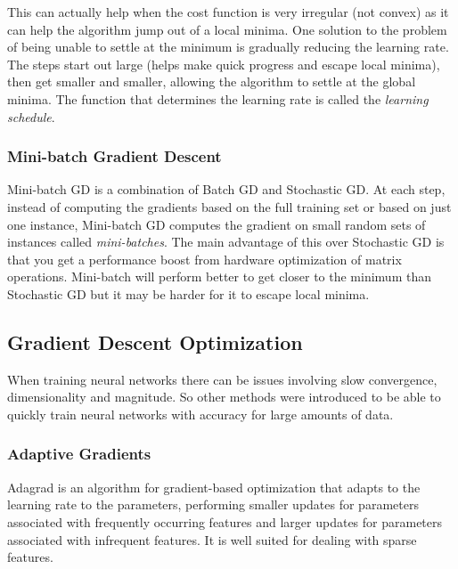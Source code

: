 \documentclass[12pt]{article}
\begin{document}
            This can actually help when the cost function is very irregular (not convex) as it can help the algorithm
            jump out of a local minima. One solution to the problem of being unable to settle at the minimum is
            gradually reducing the learning rate. The steps start out large (helps make quick progress and escape local
            minima), then get smaller and smaller, allowing the algorithm to settle at the global minima. The function
            that determines the learning rate is called the \textit{learning schedule}.
        
        \subsubsection{Mini-batch Gradient Descent}
            Mini-batch GD is a combination of Batch GD and Stochastic GD. At each step, instead of computing the
            gradients based on the full training set or based on just one instance, Mini-batch GD computes the gradient
            on small random sets of instances called \textit{mini-batches}. The main advantage of this over Stochastic
            GD is that you get a performance boost from hardware optimization of matrix operations. Mini-batch will
            perform better to get closer to the minimum than Stochastic GD but it may be harder for it to escape local
            minima.
    
    \subsection{Gradient Descent Optimization} \label{sec:GDO}
        When training neural networks there can be issues involving slow convergence, dimensionality and magnitude. So
        other methods were introduced to be able to quickly train neural networks with accuracy for large amounts of
        data.
        
        \subsubsection{Adaptive Gradients} \label{sec:AdaGrad}
            Adagrad is an algorithm for gradient-based optimization that adapts to the learning rate to the parameters,
            performing smaller updates for parameters associated with frequently occurring features and larger updates for
            parameters associated with infrequent features. It is well suited for dealing with sparse features.
\end{document}
